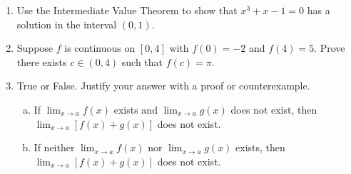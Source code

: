 \documentclass[11pt]{article}
\begin{document}
\begin{enumerate}[resume]
\item Use the Intermediate Value Theorem to show that $x^3 + x - 1 = 0$ has a solution in the interval $(0, 1)$.

\item Suppose $f$ is continuous on $[0, 4]$ with $f(0) = -2$ and $f(4) = 5$. Prove there exists $c \in (0, 4)$ such that $f(c) = \pi$.

\item True or False. Justify your answer with a proof or counterexample.
\begin{enumerate}[(a)]
  \item If $\displaystyle \lim_{x \to a} f(x)$ exists and $\displaystyle \lim_{x \to a} g(x)$ does not exist, then $\displaystyle \lim_{x \to a} [f(x) + g(x)]$ does not exist.
  \item If neither $\displaystyle \lim_{x \to a} f(x)$ nor $\displaystyle \lim_{x \to a} g(x)$ exists, then $\displaystyle \lim_{x \to a} [f(x) + g(x)]$ does not exist.
\end{enumerate}
\end{enumerate}
\end{document}
